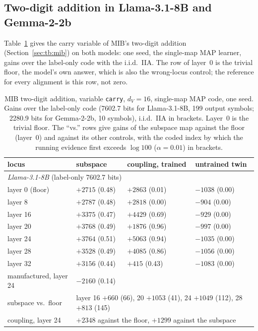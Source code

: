 \documentclass[11pt,a4paper]{article}
\newcommand{\dv}{d_V}
\begin{document}
\subsection{Two-digit addition in Llama-3.1-8B and Gemma-2-2b}
\label{sec:res:mib}

Table~\ref{tab:mib} gives the carry variable of MIB's two-digit addition (Section~\ref{sec:tb:mib}) on both models: one seed, the single-map MAP learner, gains over the label-only code with the i.i.d.\ IIA. The row of layer~0 is the trivial floor, the model's own answer, which is also the wrong-locus control; the reference for every alignment is this row, not zero.

\begin{table}[htbp]
\centering\small
\caption{MIB two-digit addition, variable \texttt{carry}, $\dv=16$, single-map MAP code, one seed. Gains over the label-only code (7602.7 bits for Llama-3.1-8B, 199 output symbols; 2280.9 bits for Gemma-2-2b, 10 symbols), i.i.d.\ IIA in brackets. Layer~0 is the trivial floor. The ``vs.'' rows give gains of the subspace map against the floor (layer~0) and against its other controls, with the coded index by which the running evidence first exceeds $\log100$ ($\alpha=0.01$) in brackets.}
\label{tab:mib}
\begin{tabular}{llll}
\toprule
locus & subspace & coupling, trained & untrained twin\\
\midrule
\multicolumn{4}{l}{\emph{Llama-3.1-8B} (label-only 7602.7 bits)}\\
layer 0 (floor) & $+2715$ (0.48) & $+2863$ (0.01) & $-1038$ (0.00)\\
layer 8 & $+2787$ (0.48) & $+2818$ (0.00) & $-904$ (0.00)\\
layer 16 & $+3375$ (0.47) & $+4429$ (0.69) & $-929$ (0.00)\\
layer 20 & $+3768$ (0.49) & $+1876$ (0.96) & $-997$ (0.00)\\
layer 24 & $+3764$ (0.51) & $+5063$ (0.94) & $-1035$ (0.00)\\
layer 28 & $+3528$ (0.49) & $+4085$ (0.86) & $-1056$ (0.00)\\
layer 32 & $+3156$ (0.44) & $+415$ (0.43) & $-1083$ (0.00)\\
manufactured, layer 24 & \multicolumn{3}{l}{$-2160$ (0.14)}\\
subspace vs.\ floor & \multicolumn{3}{l}{layer 16 $+660$ (66), 20 $+1053$ (41), 24 $+1049$ (112), 28 $+813$ (145)}\\
coupling, layer 24 & \multicolumn{3}{l}{$+2348$ against the floor, $+1299$ against the subspace}\\

\end{tabular}
\end{table}
\end{document}
